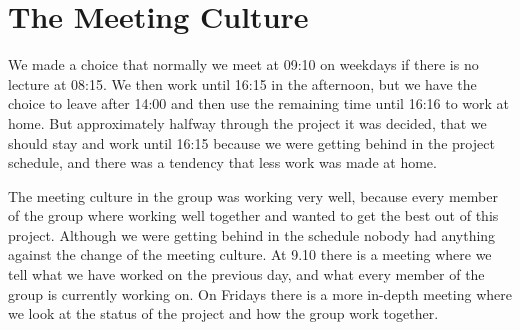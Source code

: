 \section{The Meeting Culture}
We made a choice that normally we meet at 09:10 on weekdays if there is no lecture at 08:15. We then work until 16:15 in the afternoon, but we have the choice to leave after 14:00 and then use the remaining time  until 16:16 to work at home. But approximately halfway through the project it was decided, that we should stay and work until 16:15 because we were getting behind in the project schedule, and there was a tendency that less work was made at home.

The meeting culture in the group was working very well, because every member of the group where working well together and wanted to get the best out of this project. Although we were getting behind in the schedule nobody had anything against the change of the meeting culture. At 9.10 there is a meeting where we tell what we have worked on the previous day, and what every member of the group is currently working on. On Fridays there is a more in-depth meeting where we look at the status of the project and how the group work together.